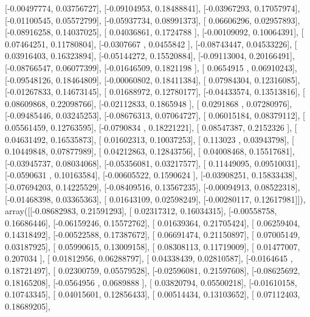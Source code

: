 \documentclass{article}
\begin{document}
       [-0.00497774,  0.03756727],
       [-0.09104953,  0.18488841],
       [-0.03967293,  0.17057974],
       [-0.01100545,  0.05572799],
       [-0.05937734,  0.08991373],
       [ 0.06606296,  0.02957893],
       [-0.08916258,  0.14037025],
       [ 0.04036861,  0.1724788 ],
       [-0.00109092,  0.10064391],
       [ 0.07464251,  0.11780804],
       [-0.0307667 ,  0.0455842 ],
       [-0.08743447,  0.04533226],
       [ 0.03916403,  0.16323894],
       [-0.05144272,  0.15520884],
       [-0.09113004,  0.20166491],
       [-0.08766547,  0.06077399],
       [-0.01646509,  0.1821198 ],
       [ 0.0654915 ,  0.06910243],
       [-0.09548126,  0.18464809],
       [-0.00060802,  0.18411384],
       [ 0.07984304,  0.12316085],
       [-0.01267833,  0.14673145],
       [ 0.01688972,  0.12780177],
       [-0.04433574,  0.13513816],
       [ 0.08609868,  0.22098766],
       [-0.02112833,  0.1865948 ],
       [ 0.0291868 ,  0.07280976],
       [-0.09485446,  0.03245253],
       [-0.08676313,  0.07064727],
       [ 0.06015184,  0.08379112],
       [ 0.05561459,  0.12763595],
       [-0.0790834 ,  0.18221221],
       [ 0.08547387,  0.2152326 ],
       [ 0.04631492,  0.16535873],
       [ 0.01602313,  0.10037253],
       [ 0.113023  ,  0.03943798],
       [ 0.10449848,  0.07877989],
       [ 0.04212863,  0.12843756],
       [ 0.04008468,  0.15517681],
       [-0.03945737,  0.08034068],
       [-0.05356081,  0.03217577],
       [ 0.11449095,  0.09510031],
       [-0.0590631 ,  0.10163584],
       [-0.00605522,  0.1590624 ],
       [-0.03908251,  0.15833438],
       [-0.07694203,  0.14225529],
       [-0.08409516,  0.13567235],
       [-0.00094913,  0.08522318],
       [-0.01468398,  0.03365363],
       [ 0.01643109,  0.02598249],
       [-0.00280117,  0.12617981]]), array([[-0.08682983,  0.21591293],
       [ 0.02317312,  0.16034315],
       [-0.00558758,  0.16686446],
       [-0.06159246,  0.15572762],
       [ 0.01639364,  0.21705424],
       [ 0.06259404,  0.14318492],
       [-0.00522588,  0.17387672],
       [ 0.06691474,  0.21150897],
       [ 0.07005149,  0.03187925],
       [ 0.05990615,  0.13009158],
       [ 0.08308113,  0.11719009],
       [ 0.01477007,  0.207034  ],
       [ 0.01812956,  0.06288797],
       [ 0.04338439,  0.02810587],
       [-0.0164645 ,  0.18721497],
       [ 0.02300759,  0.05579528],
       [-0.02596081,  0.21597608],
       [-0.08625692,  0.18165208],
       [-0.0564956 ,  0.0689888 ],
       [ 0.03820794,  0.05500218],
       [-0.01610158,  0.10743345],
       [ 0.04015601,  0.12856433],
       [ 0.00514434,  0.13103652],
       [ 0.07112403,  0.18689205],
\end{document}
